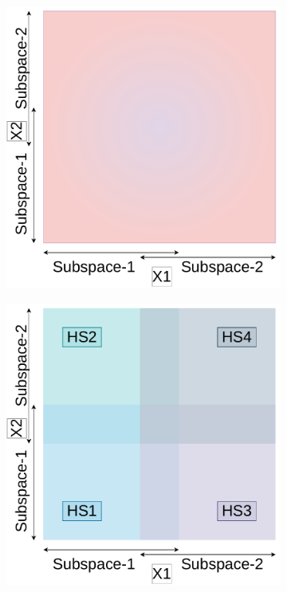 \begin{figure}[H]
	\centering
	\begin{subfigure}{0.95\textwidth}
		\centering
		\includegraphics[scale=0.3]{figures/ovr-dbo/ovr-dbo-01.pdf}
		\caption{}
		\label{fig:ovr-dsbo-a}
	\end{subfigure}
	\begin{subfigure}{0.45\textwidth}
		\centering
		\includegraphics[scale=0.3]{figures/ovr-dbo/ovr-dbo-02.pdf}

\end{subfigure}
\end{figure}
